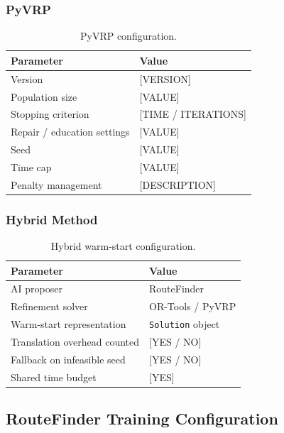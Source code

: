 \subsubsection*{PyVRP}

\begin{table}[H]
\centering
\caption{PyVRP configuration.}
\label{tab:pyvrp}
\begin{tabular}{ll}
\toprule
Parameter & Value \\
\midrule
Version & [VERSION] \\
Population size & [VALUE] \\
Stopping criterion & [TIME / ITERATIONS] \\
Repair / education settings & [VALUE] \\
Seed & [VALUE] \\
Time cap & [VALUE] \\
Penalty management & [DESCRIPTION] \\
\bottomrule
\end{tabular}
\end{table}

\subsubsection*{Hybrid Method}

\begin{table}[H]
\centering
\caption{Hybrid warm-start configuration.}
\label{tab:hybrid}
\begin{tabular}{ll}
\toprule
Parameter & Value \\
\midrule
AI proposer & RouteFinder \\
Refinement solver & OR-Tools / PyVRP \\
Warm-start representation & \texttt{Solution} object \\
Translation overhead counted & [YES / NO] \\
Fallback on infeasible seed & [YES / NO] \\
Shared time budget & [YES] \\
\bottomrule
\end{tabular}
\end{table}

\subsection{RouteFinder Training Configuration}

